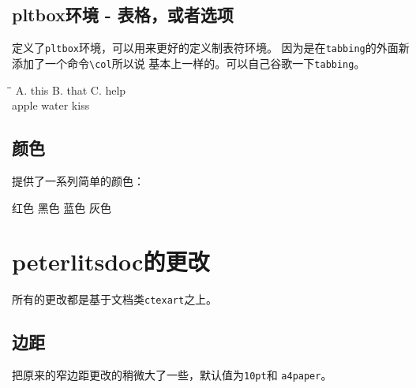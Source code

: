 \documentclass{peterlitsdoc}
\newcommand{\vb}{\verb}
\begin{document}

\subsection{pltbox环境 - 表格，或者选项}

定义了\vb|pltbox|环境，可以用来更好的定义制表符环境。
因为是在\vb|tabbing|的外面新添加了一个命令\vb|\col|所以说
基本上一样的。可以自己谷歌一下\vb|tabbing|。

\begin{pltrun}
\begin{pltbox}
\=\=\kill
A. this   \>B. that   \>C. help   \\
\plttodo[ ]apple                  \>
\plttodo[x]water                  \>
\plttodo[ ]kiss                   \\
\end{pltbox}
\end{pltrun}



\subsection{颜色}

提供了一系列简单的颜色：

\begin{pltrun}
\pltred   红色\pltrule
\pltblack 黑色\pltrule
\pltblue  蓝色\pltrule
\pltgray  灰色\pltrule
\end{pltrun}


\section{peterlitsdoc的更改}

所有的更改都是基于文档类\vb|ctexart|之上。


\subsection{边距}

把原来的窄边距更改的稍微大了一些，默认值为\vb|10pt|和
\vb|a4paper|。

\end{document}
